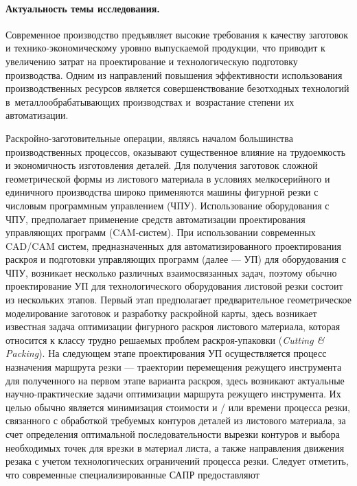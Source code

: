 \paragraph*{Актуальность темы исследования.}

Современное производство предъявляет высокие требования к качеству заготовок и
технико-экономическому уровню выпускаемой продукции,
что приводит к увеличению затрат на проектирование и технологическую подготовку производства.
Одним из направлений повышения эффективности использования
производственных ресурсов является совершенствование безотходных технологий
в~металлообрабатывающих производствах и~возрастание степени их автоматизации.

Раскройно-заготовительные операции,
являясь началом большинства производственных процессов,
оказывают существенное влияние на трудоемкость
и экономичность изготовления деталей.
Для получения заготовок сложной
геометрической формы из листового материала в условиях мелкосерийного и
единичного производства широко применяются машины фигурной резки с
числовым программным управлением
(ЧПУ).
Использование оборудования с ЧПУ, предполагает применение
средств автоматизации проектирования управляющих программ
(CAM-систем).
При использовании современных CAD/CAM систем, предназначенных для
автоматизированного проектирования раскроя и подготовки
управляющих программ
(далее --- УП)
для оборудования с ЧПУ,
возникает несколько различных взаимосвязанных задач,
поэтому обычно
проектирование УП для технологического оборудования листовой резки
состоит из нескольких этапов.
Первый этап предполагает предварительное геометрическое моделирование заготовок
и разработку раскройной карты,
здесь
возникает известная задача оптимизации фигурного раскроя листового материала,
которая
относится к классу трудно решаемых проблем раскроя-упаковки
(\textit{Cutting \& Packing}).
На следующем этапе проектирования УП осуществляется процесс назначения
маршрута резки ---
траектории перемещения режущего инструмента
для полученного на первом этапе варианта раскроя,
здесь
возникают актуальные научно-практические задачи
оптимизации маршрута режущего инструмента.
Их целью обычно является минимизация стоимости и / или времени процесса резки,
связанного с обработкой требуемых контуров деталей из листового материала,
за счет определения оптимальной последовательности вырезки контуров
и выбора необходимых точек для врезки в материал листа,
а также направления движения резака
с учетом технологических ограничений процесса резки.
Следует отметить, что современные специализированные САПР предоставляют
